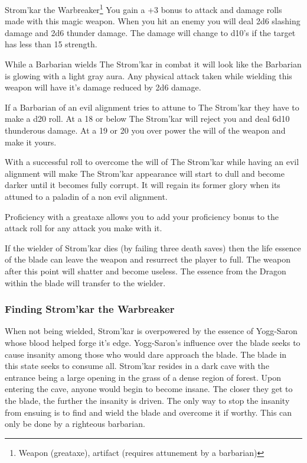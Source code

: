 \begin{commentbox}{Strom'kar the Warbreaker\footnote{Weapon (greataxe), artifact (requires attunement by a barbarian)}}	
	You gain a +3 bonus to attack and damage rolls made with this magic weapon. When you hit an enemy you will deal 2d6 slashing damage and 2d6 thunder damage. The damage will change to d10's if the target has less than 15 strength.
	
	While a Barbarian wields The Strom'kar in combat it will look like the Barbarian is glowing with a light gray aura. Any physical attack taken while wielding this weapon will have it's damage reduced by 2d6 damage.
	
	If a Barbarian of an evil alignment tries to attune to The Strom'kar they have to make a d20 roll. At a 18 or below The Strom'kar will reject you and deal 6d10 thunderous damage. At a 19 or 20 you over power the will of the weapon and make it yours.
	
	With a successful roll to overcome the will of The Strom'kar while having an evil alignment will make The Strom'kar appearance will start to dull and become darker until it becomes fully corrupt. It will regain its former glory when its attuned to a paladin of a non evil alignment.
	
	Proficiency with a greataxe allows you to add your proficiency bonus to the attack roll for any attack you make with it.
	
	If the wielder of Strom'kar dies (by failing three death saves) then the life essence of the blade can leave the weapon and resurrect the player to full. The weapon after this point will shatter and become useless. The essence from the Dragon within the blade will transfer to the wielder.
\end{commentbox}

\subsubsection{Finding Strom'kar the Warbreaker}

When not being wielded, Strom'kar is overpowered by the essence of Yogg-Saron whose blood helped forge it's edge. Yogg-Saron's influence over the blade seeks to cause insanity among those who would dare approach the blade. The blade in this state seeks to consume all. Strom'kar resides in a dark cave with the entrance being a large opening in the grass of a dense region of forest. Upon entering the cave, anyone would begin to become insane. The closer they get to the blade, the further the insanity is driven. The only way to stop the insanity from ensuing is to find and wield the blade and overcome it if worthy. This can only be done by a righteous barbarian. 

